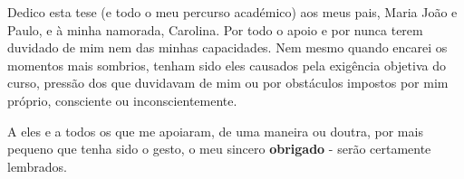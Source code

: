 
%

\begin{ntdedicatory}

Dedico esta tese (e todo o meu percurso académico) aos meus pais, Maria João e Paulo, e à minha namorada, Carolina.
Por todo o apoio e por nunca terem duvidado de mim nem das minhas capacidades.
Nem mesmo quando encarei os momentos mais sombrios, tenham sido eles causados pela exigência objetiva do curso, pressão dos que duvidavam de mim ou por obstáculos impostos por mim próprio, consciente ou inconscientemente.

A eles e a todos os que me apoiaram, de uma maneira ou doutra, por mais pequeno que tenha sido o gesto, o meu sincero \textbf{obrigado} - serão certamente lembrados.

\end{ntdedicatory}
